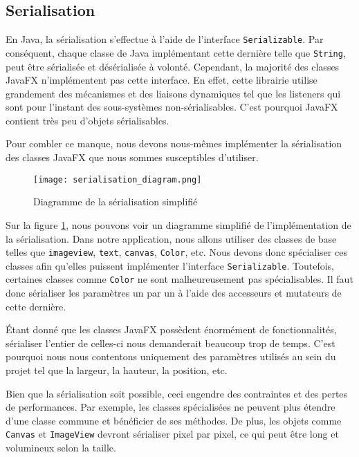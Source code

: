 \subsection{Serialisation}
\label{sec:serialisation}

En Java, la sérialisation s'effectue à l'aide de l'interface \texttt{Serializable}. Par conséquent, chaque classe de Java implémentant cette dernière telle que \texttt{String}, peut être sérialisée et désérialisée à volonté. Cependant, la majorité des classes JavaFX n'implémentent pas cette interface. En effet, cette librairie utilise grandement des mécanismes et des liaisons dynamiques tel que les listeners qui sont pour l'instant des sous-systèmes non-sérialisables. C'est pourquoi JavaFX contient très peu d'objets sérialisables.

Pour combler ce manque, nous devons nous-mêmes implémenter la sérialisation des classes JavaFX que nous sommes susceptibles d'utiliser.

\begin{figure}[h]
    \caption{Diagramme de la sérialisation simplifié}
    \centering
    \texttt{[image: serialisation\_diagram.png]}
    \label{fig:seri_diag}
\end{figure}

Sur la figure \ref{fig:seri_diag}, nous pouvons voir un diagramme simplifié de l'implémentation de la sérialisation. Dans notre application, nous allons utiliser des classes de base telles que \texttt{\gls{imageview}}, \texttt{\gls{text}}, \texttt{\gls{canvas}}, \texttt{Color}, etc. Nous devons donc spécialiser ces classes afin qu'elles puissent implémenter l'interface \texttt{Serializable}. Toutefois, certaines classes comme \texttt{Color} ne sont malheureusement pas spécialisables. Il faut donc sérialiser les paramètres un par un à l'aide des accesseurs et mutateurs de cette dernière.

Étant donné que les classes JavaFX possèdent énormément de fonctionnalités, sérialiser l'entier de celles-ci nous demanderait beaucoup trop de temps. C'est pourquoi nous nous contentons uniquement des paramètres utilisés au sein du projet tel que la largeur, la hauteur, la position, etc.



Bien que la sérialisation soit possible, ceci engendre des contraintes et des pertes de performances. Par exemple, les classes spécialisées ne peuvent plus étendre d'une classe commune et bénéficier de ses méthodes. De plus, les objets comme \texttt{Canvas} et \texttt{ImageView} devront sérialiser pixel par pixel, ce qui peut être long et volumineux selon la taille.

